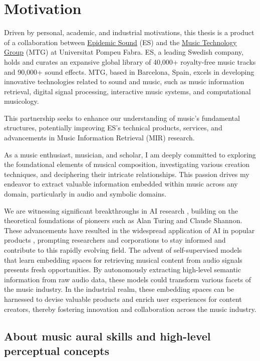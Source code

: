 \section{Motivation}

Driven by personal, academic, and industrial motivations, this thesis is a product of a collaboration between \href{https://www.epidemicsound.com/}{Epidemic Sound} (ES) and the \href{https://www.upf.edu/web/mtg}{Music Technology Group} (MTG) at Universitat Pompeu Fabra. ES, a leading Swedish company, holds and curates an expansive global library of 40,000+ royalty-free music tracks and 90,000+ sound effects. MTG, based in Barcelona, Spain, excels in developing innovative technologies related to sound and music, such as music information retrieval, digital signal processing, interactive music systems, and computational musicology.

This partnership seeks to enhance our understanding of music's fundamental structures, potentially improving ES's technical products, services, and advancements in Music Information Retrieval (MIR) research. 

As a music enthusiast, musician, and scholar, I am deeply committed to exploring the foundational elements of musical composition, investigating various creation techniques, and deciphering their intricate relationships. This passion drives my endeavor to extract valuable information embedded within music across any domain, particularly in audio and symbolic domains.

We are witnessing significant breakthroughs in AI research \cite{Vaswani2017AttentionNeed}, building on the theoretical foundations of pioneers such as Alan Turing and Claude Shannon. These advancements have resulted in the widespread application of AI in popular products \cite{OpenAI2023GPT-4Report}, prompting researchers and corporations to stay informed and contribute to this rapidly evolving field. The advent of self-supervised models that learn embedding spaces for retrieving musical content from audio signals presents fresh opportunities. By autonomously extracting high-level semantic information from raw audio data, these models could transform various facets of the music industry. In the industrial realm, these embedding spaces can be harnessed to devise valuable products and enrich user experiences for content creators, thereby fostering innovation and collaboration across the music industry.


\subsection{About music aural skills and high-level perceptual concepts}

